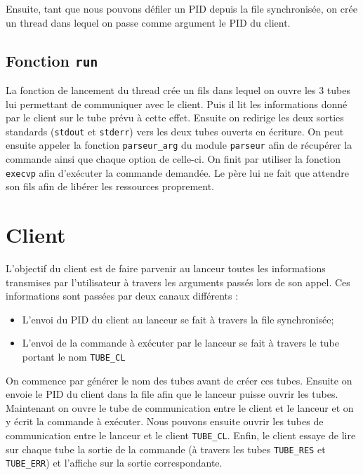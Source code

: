 \documentclass[12pt]{article}
\begin{document}
Ensuite, tant que nous pouvons défiler un PID depuis la file synchronisée,
on crée un thread dans lequel on passe comme argument le PID du client.

\subsection{Fonction \texttt{run}}
La fonction de lancement du thread crée un fils dans lequel on ouvre les 3
tubes lui permettant de communiquer avec le client. Puis il lit les
informations donné par le client sur le tube prévu à cette effet. Ensuite on
redirige les deux sorties standards (\texttt{stdout} et \texttt{stderr}) vers
les deux tubes ouverts en écriture. On peut ensuite appeler la fonction
\texttt{parseur\_arg} du module \texttt{parseur} afin de récupérer la commande
ainsi que chaque option de celle-ci. On finit par utiliser la fonction
\texttt{execvp} afin d'exécuter la commande demandée. Le père lui ne fait que
attendre son fils afin
de libérer les ressources proprement.

\section{Client}
L'objectif du client est de faire parvenir au lanceur toutes les
informations transmises par l'utilisateur à travers les arguments passés lors
de son appel. Ces informations sont passées par deux canaux différents :
\begin{itemize}
    \item L'envoi du PID du client au lanceur se fait à travers la file
          synchronisée;
    \item L'envoi de la commande à exécuter par le lanceur se fait à
          travers le tube portant le nom \texttt{TUBE\_CL}
\end{itemize}
On commence par générer le nom des tubes avant de créer ces tubes. Ensuite
on
envoie le PID du client dans la file afin que le lanceur puisse ouvrir les
tubes.
Maintenant on ouvre le tube de communication entre le client et le lanceur
et on y écrit la commande à exécuter.
Nous pouvons ensuite ouvrir les tubes de communication entre le lanceur et
le client \texttt{TUBE\_CL}. Enfin, le client essaye de lire sur chaque tube la
sortie de la commande (à travers les tubes \texttt{TUBE\_RES} et
\texttt{TUBE\_ERR}) et l'affiche sur la sortie correspondante.
\end{document}
